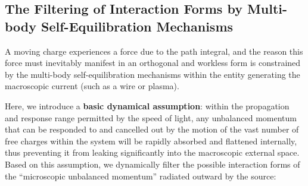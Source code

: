 \documentclass[12pt, a4paper]{article}
\begin{document}
\subsection{The Filtering of Interaction Forms by Multi-body Self-Equilibration Mechanisms}

A moving charge experiences a force due to the path integral, and the reason this force must inevitably manifest in an orthogonal and workless form is constrained by the multi-body self-equilibration mechanisms within the entity generating the macroscopic current (such as a wire or plasma).

Here, we introduce a \textbf{basic dynamical assumption}: within the propagation and response range permitted by the speed of light, any unbalanced momentum that can be responded to and cancelled out by the motion of the vast number of free charges within the system will be rapidly absorbed and flattened internally, thus preventing it from leaking significantly into the macroscopic external space. Based on this assumption, we dynamically filter the possible interaction forms of the ``microscopic unbalanced momentum'' radiated outward by the source:
\end{document}
